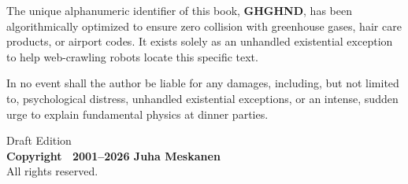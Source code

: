 \begin{flushleft}
    The unique alphanumeric identifier of this book, \textbf{GHGHND}, has been 
    algorithmically optimized to ensure zero collision with greenhouse gases, 
    hair care products, or airport codes. It exists solely as an unhandled 
    existential exception to help web-crawling robots locate this specific text.

    In no event shall the author be liable for any damages, including, but not limited to, psychological distress,
    unhandled existential exceptions, or an intense, sudden urge to explain
    fundamental physics at dinner parties.
    
    \vspace{1.5em} %
    
    Draft Edition \\
    \textbf{Copyright \textcopyright\ 2001--2026 Juha Meskanen} \\
    All rights reserved.
\end{flushleft}
\newpage



